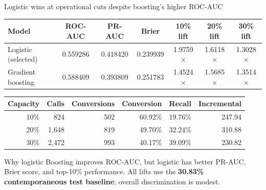 \documentclass[aspectratio=169,11pt]{beamer}
\begin{document}
\begin{frame}{Logistic wins at operational cuts despite boosting's higher ROC-AUC}
\vspace{-0.3em}
\begin{table}
\scriptsize
\begin{tabular}{lcccccc}
\toprule
\textbf{Model} & \textbf{ROC-AUC} & \textbf{PR-AUC} & \textbf{Brier} & \textbf{10\% lift} & \textbf{20\% lift} & \textbf{30\% lift} \\
\midrule
Logistic (selected) & 0.559286 & 0.418420 & 0.239939 & 1.9759$\times$ & 1.6118$\times$ & 1.3028$\times$ \\
Gradient boosting & 0.588409 & 0.393809 & 0.251783 & 1.4524$\times$ & 1.5685$\times$ & 1.3514$\times$ \\
\bottomrule
\end{tabular}
\end{table}

\vspace{0.25em}
\begin{table}
\scriptsize
\begin{tabular}{rrrrrr}
\toprule
\textbf{Capacity} & \textbf{Calls} & \textbf{Conversions} & \textbf{Conversion} & \textbf{Recall} & \textbf{Incremental} \\
\midrule
10\% & 824 & 502 & 60.92\% & 19.76\% & 247.94 \\
20\% & 1,648 & 819 & 49.70\% & 32.24\% & 310.88 \\
30\% & 2,472 & 993 & 40.17\% & 39.09\% & 230.82 \\
\bottomrule
\end{tabular}
\end{table}

\vspace{0.25em}
\begin{block}{Why logistic}
Boosting improves ROC-AUC, but logistic has better PR-AUC, Brier score, and top-10\% performance. All lifts use the \textbf{30.83\% contemporaneous test baseline}; overall discrimination is modest.
\end{block}
\end{frame}
\end{document}
